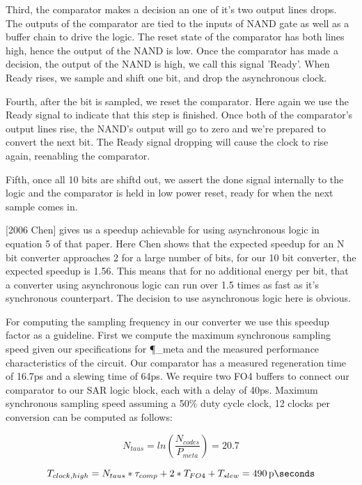 \documentclass[10pt,journal]{IEEEtran}\usepackage{longtable}
\begin{document}
Third, the comparator makes a decision an one of it's two output lines drops. 
The outputs of the comparator are tied to the inputs of NAND gate as well as a buffer chain to drive the logic.
The reset state of the comparator has both lines high, hence the output of the NAND is low.
Once the comparator has made a decision, the output of the NAND is high, we call this signal 'Ready'. When Ready rises, we sample and shift one bit, and drop the asynchronous clock.

Fourth, after the bit is sampled, we reset the comparator. Here again we use the Ready signal to indicate that this step is finished. Once both of the comparator's output lines rise, the NAND's output will go to zero and we're prepared to convert the next bit. The Ready signal dropping will cause the clock to rise again, reenabling the comparator.

Fifth, once all 10 bits are shiftd out, we assert the done signal internally to the logic and the comparator is held in low power reset, ready for when the next sample comes in.

[2006 Chen] gives us a speedup achievable for using asynchronous logic in equation 5 of that paper. Here Chen shows that the expected speedup for an N bit converter approaches 2 for a large number of bits, for our 10 bit converter, the expected speedup is 1.56.
This means that for no additional energy per bit, that a converter using asynchronous logic can run over 1.5 times as fast as it's synchronous counterpart. The decision to use asynchronous logic here is obvious.

For computing the sampling frequency in our converter we use this speedup factor as a guideline. First we compute the maximum synchronous sampling speed given our specifications for \P_{meta} and the measured performance characteristics of the circuit. Our comparator has a measured regeneration time of 16.7ps and a slewing time of 64ps. We require two FO4 buffers to connect our comparator to our SAR logic block, each with a delay of 40ps. Maximum synchronous sampling speed assuming a 50\% duty cycle clock, 12 clocks per conversion can be computed as follows:

\begin{equation}
  N_{taus} = ln\left(\frac{N_{codes}}{P_{meta}}\right) = 20.7
\end{equation}

\begin{equation}
  T_{clock,high} = N_{taus} * \tau_{comp} + 2 * T_{FO4} + T_{slew} = \SI{490}{\pico\seconds}
\end{equation}
\end{document}
